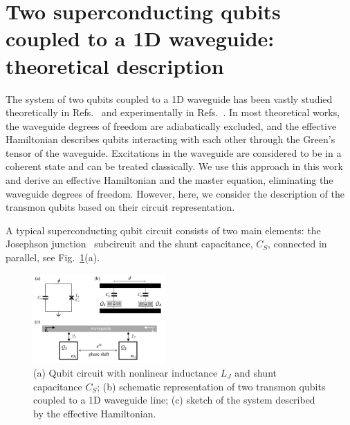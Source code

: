 \documentclass[lettersize,journal]{IEEEtran}
\begin{document}
\section{Two superconducting qubits coupled to a 1D waveguide: theoretical description}
\noindent The system of two qubits coupled to a 1D waveguide has been vastly studied theoretically in Refs.~\cite{muller_nonreciprocal_2017, dai_rectification_2015, Nefedkin2022, trivedi_fano-qubits_2023, lalumiere_input-output_2013} and experimentally in Refs.~\cite{rosario_hamann_nonreciprocity_2018}. 
In most theoretical works, the waveguide degrees of freedom are adiabatically excluded, and the effective Hamiltonian describes qubits interacting with each other through the Green's tensor of the waveguide.
Excitations in the waveguide are considered to be in a coherent state and can be treated classically.
We use this approach in this work and derive an effective Hamiltonian and the master equation, eliminating the waveguide degrees of freedom.
However, here, we consider the description of the transmon qubits based on their circuit representation.

A typical superconducting qubit circuit consists of two main elements: the Josephson junction~\cite{Josephson1962Possible} subcircuit and the shunt capacitance, $C_S$, connected in parallel, see Fig.~\ref{fig:01}(a). 

\begin{figure}[h]
    \centering
    \includegraphics[width=0.45\textwidth]{fig_1}
    \caption{(a) Qubit circuit with nonlinear inductance $L_J$ and shunt capacitance $C_S$; (b) schematic representation of two transmon qubits coupled to a 1D waveguide line; (c) sketch of the system described by the effective Hamiltonian.}
    \label{fig:01}
\end{figure}
\end{document}
